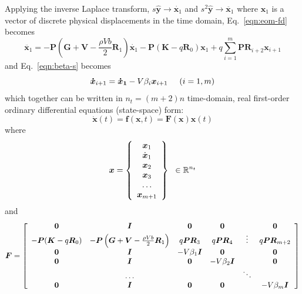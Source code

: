 \documentclass[11pt,openany,twoside]{book}
\numberwithin{equation}{section}		%
\newcommand{\Matrix}[1]{\boldsymbol{#1}}
\newcommand{\Vector}[1]{\boldsymbol{#1}}
\newcommand{\Sectref}[1]{\S\ref{#1}}
\newcommand{\Eqn}[1]{Eq.\ \ref{#1}}  %
\begin{document}
Applying the inverse Laplace transform,
$s\hat{\Vector{y}} \rightarrow \dot{\Vector{x}_1}$
and $s^2\hat{\Vector{y}} \rightarrow \ddot{\Vector{x}_1}$
where $\Vector{x}_1$ is a vector of discrete physical displacements in the time domain,
\Eqn{eqn:eom-fd} becomes
\begin{equation}
	\ddot{\Vector{x}_1} = -\Matrix{P} \left( \Matrix{G} + \Matrix{V} -
        \frac{\rho V b}{2}\Matrix{R}_1 \right) \dot{\Vector{x}_1} -
        \Matrix{P} \left(\Matrix{K} - q\Matrix{R}_0 \right)\Vector{x}_1 + 
		  q \sum_{i=1}^{m} \Matrix{PR}_{i+2} \Vector{x}_{i+1}		\nonumber
\end{equation}
and \Eqn{eqn:beta-s} becomes
\begin{equation}
	\Vector{\dot{x}}_{i+1} = \Vector{\dot{x}_1} - V \beta_i \Vector{x}_{i+1}
			\hspace{0.5cm}(i = 1, m)	\nonumber
\end{equation}
which together can be written in $n_t = (m+2)n$ time-domain, real first-order ordinary differential
equations (state-space) form:
\begin{equation}\label{eqn:statespace}
	\Vector{\dot{x}}(t) = \Vector{f}(\Vector{x},t) = \Matrix{F}(\Vector{x})\Vector{x}(t)
\end{equation}
where
\begin{equation}
	\Vector{x} = \left\{ \begin{array}{c}
                      \Vector{x}_1 \\
                      \dot{\Vector{x}}_1 \\
                      \Vector{x}_2 \\
                      \Vector{x}_3 \\
                      \ldots \\
                      \Vector{x}_{m+1}
                      \end{array} \right\} \;\; \in \mathbb{R}^{n_t}\notag
\end{equation}
and
\begin{equation}
	\Matrix{F} = \left[ \begin{array}{cccccc}
							\Matrix{0}  &  \Matrix{I}   &    \Matrix{0}    &    \Matrix{0}    &    & \Matrix{0} \\
							- \Matrix{P} ( \Matrix{K} - q \Matrix{R}_0 ) &  - \Matrix{P} \left( \Matrix{G} + \Matrix{V}
							- \frac{\rho V b}{2} \Matrix{R}_1 \right)   &  q \Matrix{PR}_3 & q \Matrix{PR}_4    & \vdots  & q \Matrix{PR}_{m+2} \\
							\Matrix{0}  &  \Matrix{I}   &  -V \beta_1 \Matrix{I}    &    \Matrix{0}    &    & \Matrix{0} \\
							\Matrix{0}  &  \Matrix{I}   & \Matrix{0} &  -V \beta_2 \Matrix{I}    &    & \Matrix{0} \\
							&  \ldots &   &  & \ddots  & \\
							\Matrix{0}  &  \Matrix{I}   & \Matrix{0} &  \Matrix{0}    &    & -V \beta_m \Matrix{I}
					\end{array} \right] \notag
\end{equation}
\end{document}

